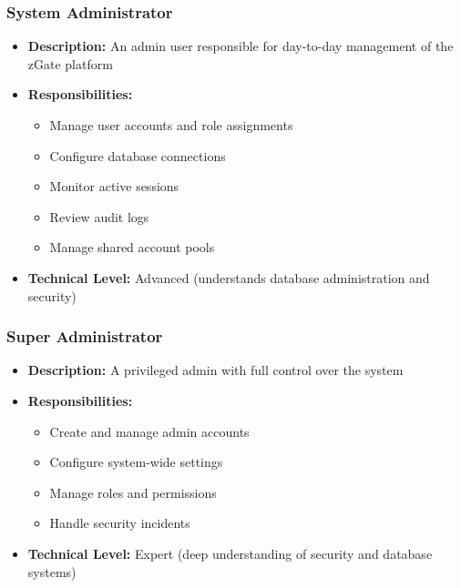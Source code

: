 \subsubsection{System Administrator}
\begin{itemize}
    \item \textbf{Description:} An admin user responsible for day-to-day management of the zGate platform
    \item \textbf{Responsibilities:}
    \begin{itemize}
        \item Manage user accounts and role assignments
        \item Configure database connections
        \item Monitor active sessions
        \item Review audit logs
        \item Manage shared account pools
    \end{itemize}
    \item \textbf{Technical Level:} Advanced (understands database administration and security)
\end{itemize}

\subsubsection{Super Administrator}
\begin{itemize}
    \item \textbf{Description:} A privileged admin with full control over the system
    \item \textbf{Responsibilities:}
    \begin{itemize}
        \item Create and manage admin accounts
        \item Configure system-wide settings
        \item Manage roles and permissions
        \item Handle security incidents
    \end{itemize}
    \item \textbf{Technical Level:} Expert (deep understanding of security and database systems)
\end{itemize}

